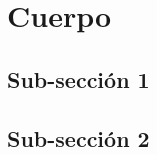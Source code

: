 \section{Cuerpo} %
\label{sec:cuerpo} %

\subsection{Sub-sección 1}
\label{subsec:sub_seccion_1}

\lipsum[3]

\subsection{Sub-sección 2}
\label{subsec:sub_seccion_2}

\lipsum[4-6]

